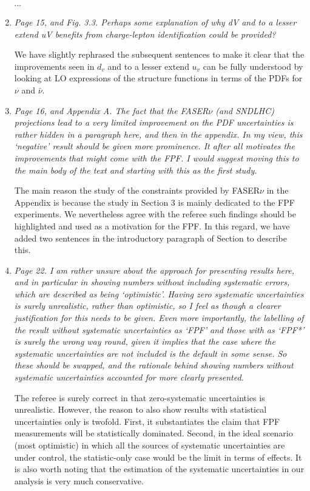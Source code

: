\documentclass[11pt,a4paper]{article}
\begin{document}
\begin{enumerate}
	$\cdots$
	
	\item {\it Page 15, and Fig. 3.3. Perhaps some explanation of why dV and to a lesser extend uV
		benefits from charge-lepton identification could be provided?
	}
	
	We have slightly rephrased the subsequent sentences to make it clear that the improvements
	seen in $d_v$ and to a lesser extend $u_v$ can be fully understood by looking at LO expressions
	of the structure functions in terms of the PDFs for $\nu$ and $\bar{\nu}$.
	
	\item {\it Page 16, and Appendix A. The fact that the FASER$\nu$ (and SNDLHC) projections lead
		to a very limited improvement on the PDF uncertainties is rather hidden in a paragraph
		here, and then in the appendix. In my view, this ‘negative’ result should be given more
		prominence. It after all motivates the improvements that might come with the FPF. I
		would suggest moving this to the main body of the text and starting with this as the
		first study.
	}
	
	The main reason the study of the constraints provided by FASER$\nu$ in the Appendix is because
	the study in Section 3 is mainly dedicated to the FPF experiments. We nevertheless agree with the
	referee such findings should be highlighted and used as a motivation for the FPF. In this regard, we
	have added two sentences in the introductory paragraph of Section to describe this.
	
	\item {\it Page 22. I am rather unsure about the approach for presenting results here, and in
		particular in showing numbers without including systematic errors, which are described
		as being ‘optimistic’. Having zero systematic uncertainties is surely unrealistic, rather
		than optimistic, so I feel as though a clearer justification for this needs to be given.
		Even more importantly, the labelling of the result without systematic uncertainties as
		‘FPF’ and those with as ‘FPF*’ is surely the wrong way round, given it implies that
		the case where the systematic uncertainties are not included is the default in some
		sense. So these should be swapped, and the rationale behind showing numbers without
		systematic uncertainties accounted for more clearly presented.
	}
	
	The referee is surely correct in that zero-systematic uncertainties is unrealistic. However,
	the reason to also show results with statistical uncertainties only is twofold. First, it
	substantiates the claim that FPF measurements will be statistically dominated. Second, in the
	ideal scenario (most optimistic) in which all the sources of systematic uncertainties are 
	under control, the statistic-only case would be the limit in terms of effects. It is also 
	worth noting that the estimation of the systematic uncertainties in our analysis is very 
	much conservative.
	

\end{enumerate}
\end{document}
